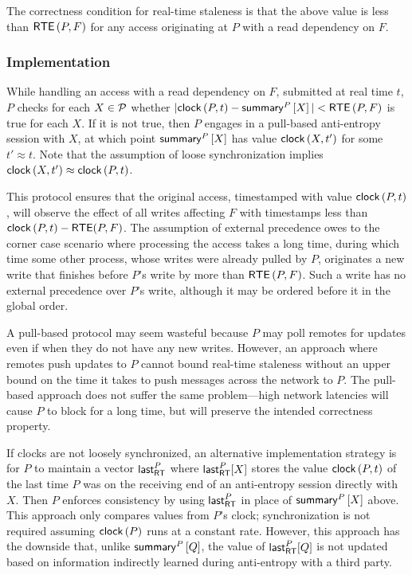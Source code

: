 \documentclass[]             %
{NASA}                       %
\theoremstyle{definition}
\begin{document}
The correctness condition for real-time staleness is that the above
value is less than $\mathsf{RTE}\left(P, F\right)$ for any access originating
at $P$ with a read dependency on $F$.

\subsubsection{Implementation}
While handling an access with a read dependency on $F$, submitted at
real time $t$, $P$ checks for each $X \in \mathcal{P}$ whether
$|\mathsf{clock}\left(P, t\right) - \mathsf{summary}^{P}\left[X\right]| < \mathsf{RTE}\left(P, F\right)$ is true for
each $X$. If it is not true, then $P$ engages in a pull-based
anti-entropy session with $X$, at which point $\mathsf{summary}^{P}\left[X\right]$ has
value $\mathsf{clock}\left(X, t'\right)$ for some $t' \approx t$. Note that the assumption of
loose synchronization implies $\mathsf{clock}\left(X, t'\right) \approx \mathsf{clock}\left(P, t\right)$.

This protocol ensures that the original access, timestamped with value
$\mathsf{clock}\left(P,t\right)$, will observe the effect of all writes affecting $F$
with timestamps less than $\mathsf{clock}\left(P, t\right) - \mathsf{RTE}(P, F)$. The assumption
of external precedence owes to the corner case scenario where
processing the access takes a long time, during which time some other
process, whose writes were already pulled by $P$, originates a new
write that finishes before $P$'s write by more than
$\mathsf{RTE}\left(P, F\right)$. Such a write has no external precedence over
$P$'s write, although it may be ordered before it in the global order.

A pull-based protocol may seem wasteful because $P$ may poll remotes
for updates even if when they do not have any new writes. However, an
approach where remotes push updates to $P$ cannot bound real-time
staleness without an upper bound on the time it takes to push messages
across the network to $P$. The pull-based approach does not suffer the
same problem---high network latencies will cause $P$ to block for a
long time, but will preserve the intended correctness property.

If clocks are not loosely synchronized, an alternative implementation
strategy is for $P$ to maintain a vector $\mathsf{last}_{\mathsf{RT}}^{P}{}$ where
$\mathsf{last}_{\mathsf{RT}}^{P}[X]$ stores the value $\mathsf{clock}\left(P,t\right)$ of the last time $P$
was on the receiving end of an anti-entropy session directly with
$X$. Then $P$ enforces consistency by using $\mathsf{last}_{\mathsf{RT}}^{P}$ in place of
$\mathsf{summary}^{P}\left[X\right]$ above. This approach only compares values from $P$'s
clock; synchronization is not required assuming $\mathsf{clock}\left(P\right)$ runs at a
constant rate. However, this approach has the downside that, unlike
$\mathsf{summary}^{P}\left[Q\right]$, the value of $\mathsf{last}_{\mathsf{RT}}^{P}[Q]$ is not updated based on
information indirectly learned during anti-entropy with a third party.
\end{document}
